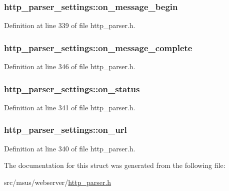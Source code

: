 \hypertarget{structhttp__parser__settings_ac44144daecc8e8adbd477b7e6a794e26}{
\subsubsection[{on\-\_\-message\-\_\-begin}]{ http\-\_\-parser\-\_\-settings\-::on\-\_\-message\-\_\-begin}}\label{structhttp__parser__settings_ac44144daecc8e8adbd477b7e6a794e26}


Definition at line 339 of file http\-\_\-parser.\-h.

\hypertarget{structhttp__parser__settings_afdd5beef93a4a7b32bc61ae088da64d2}{
\subsubsection[{on\-\_\-message\-\_\-complete}]{ http\-\_\-parser\-\_\-settings\-::on\-\_\-message\-\_\-complete}}\label{structhttp__parser__settings_afdd5beef93a4a7b32bc61ae088da64d2}


Definition at line 346 of file http\-\_\-parser.\-h.

\hypertarget{structhttp__parser__settings_a6d0f0203f3461a8889ad471de119c993}{
\subsubsection[{on\-\_\-status}]{ http\-\_\-parser\-\_\-settings\-::on\-\_\-status}}\label{structhttp__parser__settings_a6d0f0203f3461a8889ad471de119c993}


Definition at line 341 of file http\-\_\-parser.\-h.

\hypertarget{structhttp__parser__settings_a9c24dfa900b49bf3439bbfba572b42fb}{
\subsubsection[{on\-\_\-url}]{ http\-\_\-parser\-\_\-settings\-::on\-\_\-url}}\label{structhttp__parser__settings_a9c24dfa900b49bf3439bbfba572b42fb}


Definition at line 340 of file http\-\_\-parser.\-h.



The documentation for this struct was generated from the following file\-:\begin{DoxyCompactItemize}
\item 
src/msus/webserver/\hyperlink{http__parser_8h}{http\-\_\-parser.\-h}\end{DoxyCompactItemize}
